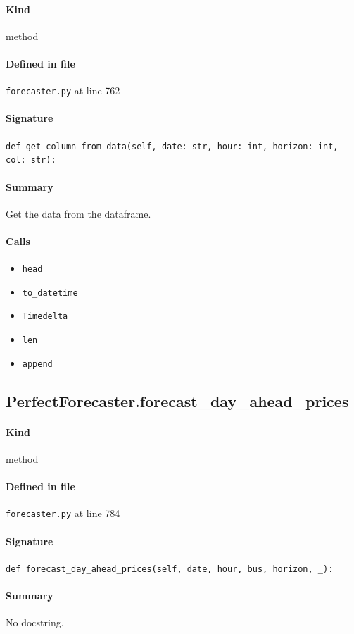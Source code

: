 \documentclass[11pt]{report}
\begin{document}
\paragraph{Kind} method
\paragraph{Defined in file} \texttt{forecaster.py} at line 762
\paragraph{Signature} \texttt{def get\_column\_from\_data(self, date: str, hour: int, horizon: int, col: str):}
\paragraph{Summary} Get the data from the dataframe.
\paragraph{Calls}
\begin{itemize}[leftmargin=*]
  \item \texttt{head}
  \item \texttt{to\_datetime}
  \item \texttt{Timedelta}
  \item \texttt{len}
  \item \texttt{append}
\end{itemize}
\subsection{PerfectForecaster.forecast\_day\_ahead\_prices}
\label{def:forecaster.py:PerfectForecaster.forecast_day_ahead_prices:L784}
\paragraph{Kind} method
\paragraph{Defined in file} \texttt{forecaster.py} at line 784
\paragraph{Signature} \texttt{def forecast\_day\_ahead\_prices(self, date, hour, bus, horizon, \_):}
\paragraph{Summary} No docstring.
\end{document}
